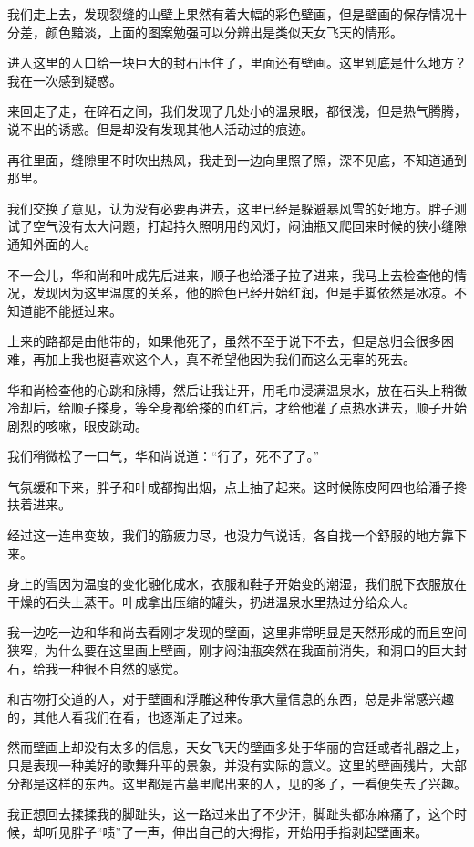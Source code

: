 我们走上去，发现裂缝的山壁上果然有着大幅的彩色壁画，但是壁画的保存情况十分差，颜色黯淡，上面的图案勉强可以分辨出是类似天女飞天的情形。

进入这里的人口给一块巨大的封石压住了，里面还有壁画。这里到底是什么地方？我在一次感到疑惑。

来回走了走，在碎石之间，我们发现了几处小的温泉眼，都很浅，但是热气腾腾，说不出的诱惑。但是却没有发现其他人活动过的痕迹。

再往里面，缝隙里不时吹出热风，我走到一边向里照了照，深不见底，不知道通到那里。

我们交换了意见，认为没有必要再进去，这里已经是躲避暴风雪的好地方。胖子测试了空气没有太大问题，打起持久照明用的风灯，闷油瓶又爬回来时候的狭小缝隙通知外面的人。

不一会儿，华和尚和叶成先后进来，顺子也给潘子拉了进来，我马上去检查他的情况，发现因为这里温度的关系，他的脸色已经开始红润，但是手脚依然是冰凉。不知道能不能挺过来。

上来的路都是由他带的，如果他死了，虽然不至于说下不去，但是总归会很多困难，再加上我也挺喜欢这个人，真不希望他因为我们而这么无辜的死去。

华和尚检查他的心跳和脉搏，然后让我让开，用毛巾浸满温泉水，放在石头上稍微冷却后，给顺子搽身，等全身都给搽的血红后，才给他灌了点热水进去，顺子开始剧烈的咳嗽，眼皮跳动。

我们稍微松了一口气，华和尚说道：“行了，死不了了。”

气氛缓和下来，胖子和叶成都掏出烟，点上抽了起来。这时候陈皮阿四也给潘子搀扶着进来。

经过这一连串变故，我们的筋疲力尽，也没力气说话，各自找一个舒服的地方靠下来。

身上的雪因为温度的变化融化成水，衣服和鞋子开始变的潮湿，我们脱下衣服放在干燥的石头上蒸干。叶成拿出压缩的罐头，扔进温泉水里热过分给众人。

我一边吃一边和华和尚去看刚才发现的壁画，这里非常明显是天然形成的而且空间狭窄，为什么要在这里画上壁画，刚才闷油瓶突然在我面前消失，和洞口的巨大封石，给我一种很不自然的感觉。

和古物打交道的人，对于壁画和浮雕这种传承大量信息的东西，总是非常感兴趣的，其他人看我们在看，也逐渐走了过来。

然而壁画上却没有太多的信息，天女飞天的壁画多处于华丽的宫廷或者礼器之上，只是表现一种美好的歌舞升平的景象，并没有实际的意义。这里的壁画残片，大部分都是这样的东西。这里都是古墓里爬出来的人，见的多了，一看便失去了兴趣。

我正想回去揉揉我的脚趾头，这一路过来出了不少汗，脚趾头都冻麻痛了，这个时候，却听见胖子“啧”了一声，伸出自己的大拇指，开始用手指剥起壁画来。

